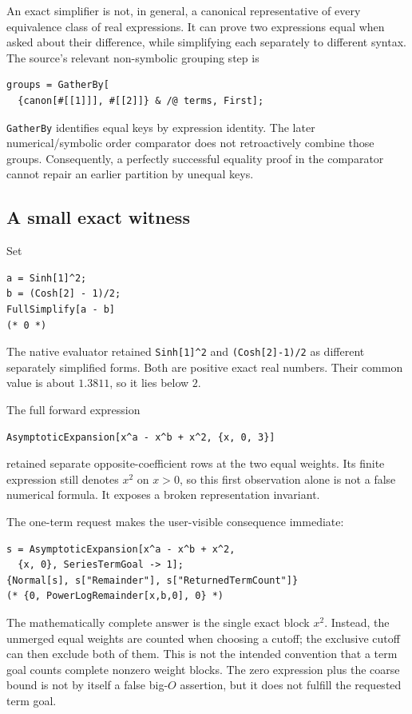 \documentclass[11pt,letterpaper]{article}
\newcommand{\code}[1]{{\small\nolinkurl{#1}}}
\begin{document}
An exact simplifier is not, in general, a canonical representative of every equivalence class of real expressions. It can prove two expressions equal when asked about their difference, while simplifying each separately to different syntax. The source's relevant non-symbolic grouping step is
\begin{lstlisting}
groups = GatherBy[
  {canon[#[[1]]], #[[2]]} & /@ terms, First];
\end{lstlisting}
\code{GatherBy} identifies equal keys by expression identity. The later numerical/symbolic order comparator does not retroactively combine those groups. Consequently, a perfectly successful equality proof in the comparator cannot repair an earlier partition by unequal keys.\cite{core}

\subsection{A small exact witness}
Set
\begin{lstlisting}
a = Sinh[1]^2;
b = (Cosh[2] - 1)/2;
FullSimplify[a - b]
(* 0 *)
\end{lstlisting}
The native evaluator retained \code{Sinh[1]^2} and \code{(Cosh[2]-1)/2} as different separately simplified forms. Both are positive exact real numbers. Their common value is about $1.3811$, so it lies below $2$.

The full forward expression
\begin{lstlisting}
AsymptoticExpansion[x^a - x^b + x^2, {x, 0, 3}]
\end{lstlisting}
retained separate opposite-coefficient rows at the two equal weights. Its finite expression still denotes $x^2$ on $x>0$, so this first observation alone is not a false numerical formula. It exposes a broken representation invariant.

The one-term request makes the user-visible consequence immediate:
\begin{lstlisting}
s = AsymptoticExpansion[x^a - x^b + x^2,
  {x, 0}, SeriesTermGoal -> 1];
{Normal[s], s["Remainder"], s["ReturnedTermCount"]}
(* {0, PowerLogRemainder[x,b,0], 0} *)
\end{lstlisting}
The mathematically complete answer is the single exact block $x^2$. Instead, the unmerged equal weights are counted when choosing a cutoff; the exclusive cutoff can then exclude both of them. This is not the intended convention that a term goal counts complete nonzero weight blocks. The zero expression plus the coarse bound is not by itself a false big-$O$ assertion, but it does not fulfill the requested term goal.
\end{document}
